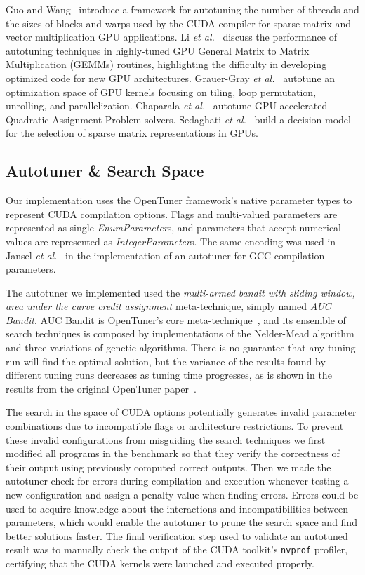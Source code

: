 Guo and Wang~\cite{guo2010auto} introduce a framework for autotuning
the number of threads and the sizes of blocks and warps used by the CUDA
compiler for sparse matrix and vector multiplication GPU applications.  Li
\emph{et al.}~\cite{li2009note} discuss the performance of autotuning
techniques in highly-tuned GPU General Matrix to Matrix Multiplication (GEMMs)
routines, highlighting the difficulty in developing optimized code for new GPU
architectures.  Grauer-Gray \emph{et al.}~\cite{grauer2012auto}
autotune an optimization space of GPU kernels focusing on tiling, loop
permutation, unrolling, and parallelization.  Chaparala \emph{et
al.}~\cite{chaparala2015autotuning} autotune GPU-accelerated Quadratic
Assignment Problem solvers.  Sedaghati \emph{et
al.}~\cite{sedaghati2015automatic} build a decision model for the selection of
sparse matrix representations in GPUs.

\subsection{Autotuner \& Search Space}
\label{sec:tunersearch}

Our implementation uses the OpenTuner framework's native parameter types to
represent CUDA compilation options. Flags and multi-valued parameters are
represented as single \emph{EnumParameter}s, and parameters that accept
numerical values are represented as \emph{IntegerParameter}s.  The same
encoding was used in Jansel \emph{et al.}~\cite{ansel2014opentuner} in the
implementation of an autotuner for GCC compilation parameters.

The autotuner we implemented used the \textit{multi-armed bandit with sliding
window, area under the curve credit assignment} meta-technique, simply named
\textit{AUC Bandit}.  AUC Bandit is OpenTuner's core
meta-technique~\cite{ansel2014opentuner}, and its ensemble of search techniques
is composed by implementations of the Nelder-Mead algorithm and three
variations of genetic algorithms.  There is no guarantee that any tuning run
will find the optimal solution, but the variance of the results found by
different tuning runs decreases as tuning time progresses, as is shown in the
results from the original OpenTuner paper~\cite{ansel2014opentuner}.

The search in the space of CUDA options potentially generates invalid parameter
combinations due to incompatible flags or architecture restrictions.  To
prevent these invalid configurations from misguiding the search techniques we
first modified all programs in the benchmark so that they verify the
correctness of their output using previously computed correct outputs. Then we
made the autotuner check for errors during compilation and execution whenever
testing a new configuration and assign a penalty value when finding errors.
Errors could be used to acquire knowledge about the interactions and
incompatibilities between parameters, which would enable the autotuner to prune
the search space and find better solutions faster.  The final verification step
used to validate an autotuned result was to manually check the output of the
CUDA toolkit's \texttt{nvprof} profiler, certifying that the CUDA kernels were
launched and executed properly.

